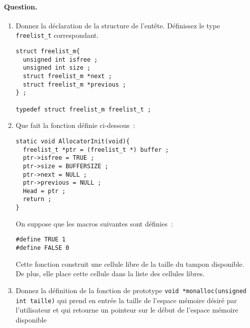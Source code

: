 \paragraph{Question.} 
\begin{enumerate}
\item Donnez la d\'eclaration de la structure de l'ent\^ete.
  D\'efinissez le type \verb+freelist_t+ correspondant.
\ifcorrection
\begin{correction}
\begin{verbatim}
struct freelist_m{
  unsigned int isfree ;
  unsigned int size ;
  struct freelist_m *next ;
  struct freelist_m *previous ;
} ;

typedef struct freelist_m freelist_t ;
\end{verbatim}
\end{correction}
\fi
\item Que fait la fonction d\'efinie ci-dessous~:
\begin{verbatim}
static void AllocatorInit(void){
  freelist_t *ptr = (freelist_t *) buffer ;
  ptr->isfree = TRUE ;
  ptr->size = BUFFERSIZE ;
  ptr->next = NULL ;
  ptr->previous = NULL ;
  Head = ptr ;
  return ;
}
\end{verbatim}
On suppose que les macros suivantes sont d\'efinies~:
\begin{verbatim}
#define TRUE 1
#define FALSE 0
\end{verbatim}
\ifcorrection
\begin{correction}
  Cette fonction construit une cellule libre de la taille du tampon
  disponible. De plus, elle place cette cellule dans la liste des
  cellules libres.
\end{correction}
\fi
\item Donnez la d\'efinition de la fonction de prototype %
  \verb+void *monalloc(unsigned int taille)+ qui prend en entr\'ee la
  taille de l'espace m\'emoire d\'esir\'e par l'utilisateur et qui
  retourne un pointeur sur le d\'ebut de l'espace m\'emoire disponible

\end{enumerate}
